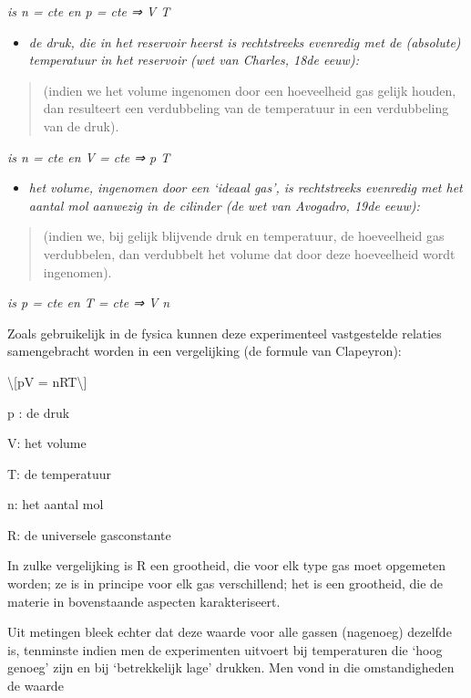\documentclass[]{article}
\begin{document}
\emph{is n = cte en p = cte ⇒ V T}

\begin{itemize}
\item
  \emph{de druk, die in het reservoir heerst is rechtstreeks evenredig
  met de (absolute) temperatuur in het reservoir (wet van Charles, 18de
  eeuw):}
\end{itemize}

\begin{quote}
(indien we het volume ingenomen door een hoeveelheid gas gelijk houden,
dan resulteert een verdubbeling van de temperatuur in een verdubbeling
van de druk).
\end{quote}

\emph{is n = cte en V = cte ⇒ p T}

\begin{itemize}
\item
  \emph{het volume, ingenomen door een `ideaal gas', is rechtstreeks
  evenredig met het aantal mol aanwezig in de cilinder (de wet van
  Avogadro, 19de eeuw):}
\end{itemize}

\begin{quote}
(indien we, bij gelijk blijvende druk en temperatuur, de hoeveelheid gas
verdubbelen, dan verdubbelt het volume dat door deze hoeveelheid wordt
ingenomen).
\end{quote}

\emph{is p = cte en T = cte ⇒ V n}

Zoals gebruikelijk in de fysica kunnen deze experimenteel vastgestelde
relaties samengebracht worden in een vergelijking (de formule van
Clapeyron):

\textbackslash{}{[}pV = nRT\textbackslash{}{]}

p : de druk

V: het volume

T: de temperatuur

n: het aantal mol

R: de universele gasconstante

In zulke vergelijking is R een grootheid, die voor elk type gas moet
opgemeten worden; ze is in principe voor elk gas verschillend; het is
een grootheid, die de materie in bovenstaande aspecten karakteriseert.

Uit metingen bleek echter dat deze waarde voor alle gassen (nagenoeg)
dezelfde is, tenminste indien men de experimenten uitvoert bij
temperaturen die `hoog genoeg' zijn en bij `betrekkelijk lage' drukken.
Men vond in die omstandigheden de waarde
\end{document}
